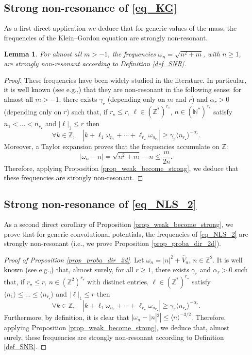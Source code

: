 \documentclass[11pt]{article}
\newcommand{\ie}{i.e.,\xspace}
\newcommand{\eg}{e.g.,\xspace}
\newtheorem{lemma}[theorem]{Lemma}
\theoremstyle{definition}
\begin{document}
\subsection{Strong non-resonance of \eqref{eq_KG}}
As a first direct application we deduce that for generic values of the mass, the frequencies of the Klein--Gordon equation are strongly non-resonant.
\begin{lemma} \label{lem_nr_KG} For almost all $m>-1$, the frequencies $\omega_n = \sqrt{n^2+m}$, with $n\geq 1$, are strongly non-resonant according to Definition \ref{def_SNR}.
\end{lemma}
\begin{proof}
These frequencies have been widely studied in the literature. In particular, it is well known (see \eg \cite{Bam03,Del09}) that they are non-resonant in the following sense: for almost all $m>-1$, there exists $\gamma_r$ (depending only on $m$ and $r$) and $\alpha_r>0$ (depending only on $r$) such that, if $r_\star \leq r$, $\ell \in (\mathbb{Z}^*)^{r_\star}$, $n \in (\mathbb{N}^*)^{r_\star}$ satisfy $ n_1 < \dots < n_{r_\star} $ and $|\ell|_1 \leq r$ then
\[
\forall k\in \mathbb{Z}, \quad |k+\ell_1 \omega_{n_1}+\cdots+ \ell_{r_\star} \omega_{n_{r_\star}} | \geq \gamma_r \langle n_{r_\star} \rangle^{-\alpha_r}.
\]
Moreover, a Taylor expansion proves that the frequencies accumulate on $\mathbb{Z}$:
\[
|\omega_n - n| = \sqrt{n^2+m} - n \leq \frac{m}{2n}.
\]
Therefore, applying Proposition \ref{prop_weak_become_strong}, we deduce that these frequencies are strongly non-resonant.
\end{proof}

\subsection{Strong non-resonance of \eqref{eq_NLS_2}} As a second direct corollary of Proposition \ref{prop_weak_become_strong}, we prove that for generic convolutional potentials, the frequencies of \eqref{eq_NLS_2} are strongly non-resonant (\ie we prove Proposition \ref{prop_proba_dir_2d}).

\begin{proof}[Proof of Proposition \ref{prop_proba_dir_2d}] Let $\omega_n = |n|^2 + \widehat{V}_n$, $n\in\mathbb{Z}^2$. It is well known (see \eg \cite[Th.\,3.22]{BG06}) that, almost surely, for all $r\geq 1$, there exists $\gamma_r$ and $\alpha_r>0$ such that, if $r_\star \leq r$, $n \in (\mathbb{Z}^2)^{r_\star}$ with distinct entries, $\ell \in (\mathbb{Z}^*)^{r_\star}$ satisfy $ \langle n_1 \rangle \leq \dots \leq \langle n_{r_\star} \rangle $ and $|\ell|_1 \leq r$ then
\[
\forall k\in \mathbb{Z}, \quad |k+\ell_1 \omega_{n_1}+\cdots+ \ell_{r_\star} \omega_{n_{r_\star}} | \geq \gamma_r \langle n_{r_\star} \rangle^{-\alpha_r}.
\]
Furthermore, by definition, it is clear that $
|\omega_n - |n|^2| \leq \langle n \rangle^{-3/2}$. Therefore, applying Proposition \ref{prop_weak_become_strong}, we deduce that, almost surely, these frequencies are strongly non-resonant according to Definition \ref{def_SNR}.
\end{proof}
\end{document}
